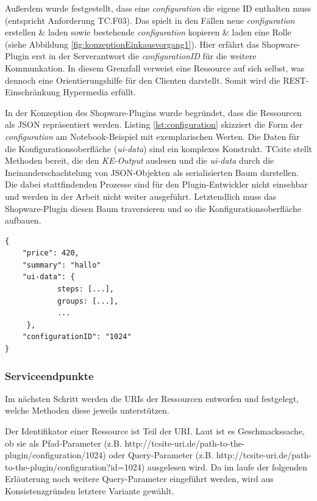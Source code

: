 \documentclass[12pt,a4paper,bibliography=totocnumbered,listof=totoc]{scrartcl}
\begin{document}
Außerdem wurde festgestellt, dass eine \emph{configuration} die eigene ID enthalten muss (entspricht Anforderung TC.F03). Das spielt in den Fällen \glqq neue \emph{configuration} erstellen \& laden\grqq{}  sowie \glqq bestehende \emph{configuration} kopieren \& laden\grqq{} eine Rolle (siehe Abbildung \ref{fig:konzeptionEinkausvorgang1}). Hier erfährt das Shopware-Plugin erst in der Serverantwort die \emph{configurationID} für die weitere Kommunkation. In diesem Grenzfall verweist eine Ressource auf sich selbst, was dennoch eine Orientierungshilfe für den Clienten darstellt. Somit wird die REST-Einschränkung \glqq Hypermedia\grqq{} erfüllt.

In der Konzeption des Shopware-Plugins wurde begründet, dass die Ressourcen als JSON repräsentiert werden. Listing \ref{lst:configuration} skizziert die Form der \emph{configuration} am Notebook-Beispiel mit exemplarischen Werten. Die Daten für die Konfigurationsoberfläche (\emph{ui-data}) sind ein komplexes Konstrukt. TCsite stellt Methoden bereit, die den \emph{KE-Output} auslesen und die \emph{ui-data} durch die Ineinanderschachtelung von JSON-Objekten als serialisierten Baum darstellen. Die dabei stattfindenden Prozesse sind für den Plugin-Entwickler nicht einsehbar und werden in der Arbeit nicht weiter ausgeführt. Letztendlich muss das Shopware-Plugin diesen Baum traversieren und so die Konfigurationsoberfläche aufbauen.

\vspace{1em}
\begin{lstlisting}[caption=Beispiel einer \emph{configuration}, label=lst:configuration]
{
	"price": 420,
	"summary": "hallo"
	"ui-data": {
			steps: [...],
			groups: [...],
			...
	 },
	"configurationID": "1024"
}
\end{lstlisting}

\subsubsection{Serviceendpunkte}
Im nächsten Schritt werden die URIs der Ressourcen entworfen und festgelegt, welche Methoden diese jeweils unterstützen.

Der Identifikator einer Ressource ist Teil der URI. Laut \citet{tilkov11} ist es Geschmackssache, ob sie als Pfad-Parameter (z.B. \glqq http://tcsite-uri.de/path-to-the-plugin/configuration/1024\grqq{}) oder Query-Parameter (z.B. \glqq http://tcsite-uri.de/path-to-the-plugin/configuration?id=1024\grqq{}) ausgelesen wird. Da im laufe der folgenden Erläuterung noch weitere Query-Parameter eingeführt werden, wird aus Konsistenzgründen letztere Variante gewählt.
\end{document}
